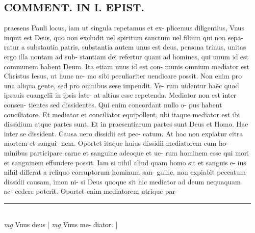 \documentclass{article}
\begin{document}
\begin{pages}
\section*{COMMENT. IN I. EPIST. }\pstart praesens Pauli locus, iam ut singula repetamus et ex- plicemus diligentius, Vnus inquit est Deus, quo non excludit uel spiritum sanctum uel filium qui non sepa- ratur a substautia patris, substantia autem unus est deus, persona trinus, unitas ergo illa nontam ad sub- stantiam dei refertur quam ad homines, qui unum id est communem habent Deum. Ita etiam unus id est con- munis omnium mediator est Christus Iesus, ut hunc ne- mo sibi peculiariter uendicare possit. Non enim pro una aliqua gente, sed pro omnibus sese impendit. Ve- rum uidentur haẽc quod ipsauis euangelii in ipsis late- at altius esse repetenda. Mediator non est inter consen- tientes sed dissidentes. Qui enim concordant nullo o- pus habent conciliatore. Et mediator et conciliator equipollent, ubi itaque mediator est ibi dissidium atque  partes sunt. Et in praesentiarum partes sunt Deus et Homo. Hae inter se dissident. Causa uero dissidii est pec- catum. At hoc non expiatur citra mortem et sangui- nem. Oportet itaque huius dissidii mediatorem cum ho- minibus participare carne et sanguine adeoque et ue- rum hominem esse qui mori et sanguinem effundere possit. Iam si nihil aliud quam homo sit et sanguis e- ius nihil differat a reliquo corruptorum hominum san- guine, non expiabit peccatum dissidii causam, imon ni- si Deus quoque sit hic mediator ad deum nequaquam ac- cedere poterit. Oportet enim mediatorem utrique par-  \pend
\vspace{0.5cm}\noindent
\vspace{0.2cm}\rule{1cm}{0.2pt}\\ 
\hspace{0.2cm}\textit{mg}
\footnotesize Vnus deus 
\normalsize| 
\hspace{0.2cm}\textit{mg}
\footnotesize Vnus me- diator. 
\normalsize| 

\end{pages}
\end{document}
